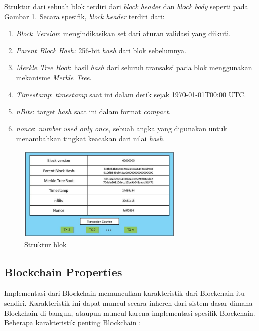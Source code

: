 \break

Struktur dari sebuah blok terdiri dari \textit{block header} dan \textit{block body} seperti pada Gambar \ref{image:struktur-blok}. Secara spesifik, \textit{block header} terdiri dari:

\begin{enumerate}
	\item \textit{Block Version}: mengindikasikan set dari aturan validasi yang diikuti.
	\item \textit{Parent Block Hash}: 256-bit \textit{hash} dari blok sebelumnya.
	\item \textit{Merkle Tree Root}: hasil \textit{hash} dari seluruh transaksi pada blok menggunakan mekanisme \textit{Merkle Tree}.
	\item \textit{Timestamp}: \textit{timestamp} saat ini dalam detik sejak 1970-01-01T00:00 UTC.
	\item \textit{nBits}: target \textit{hash} saat ini dalam format \textit{compact}.
	\item \textit{nonce}: \textit{number used only once}, sebuah angka yang digunakan untuk menambahkan tingkat keacakan dari nilai \textit{hash}.
\end{enumerate}

\begin{figure}[ht]
	\centering
	\includegraphics[width=0.7\textwidth]{resources/chapter-2/struktur-block.png}
	\caption{Struktur blok \parencite{zheng2018blockchain}}
	\label{image:struktur-blok}
\end{figure}

\subsection{Blockchain Properties}
\label{subsec:blockchain-properties}

Implementasi dari Blockchain memunculkan karakteristik dari Blockchain itu sendiri. Karakteristik ini dapat muncul secara inheren dari sistem dasar dimana Blockchain di bangun, ataupun muncul karena implementasi spesifik Blockchain. Beberapa karakteristik penting Blockchain \parencite{aimar2023extraction}:

